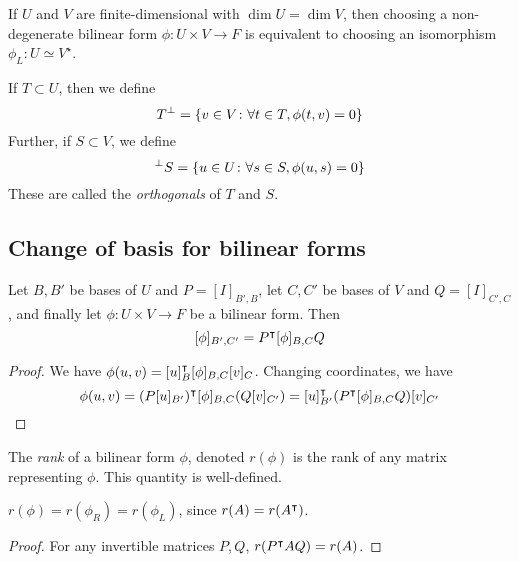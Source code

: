 \begin{corollary}
	If \( U \) and \( V \) are finite-dimensional with \( \dim U = \dim V \), then choosing a non-degenerate bilinear form \( \phi \colon U \times V \to F \) is equivalent to choosing an isomorphism \( \phi_L \colon U \simeq V^\star \).
\end{corollary}
\begin{definition}
	If \( T \subset U \), then we define
	\[
		T^\perp = \qty{ v \in V \colon \forall t \in T, \phi(t,v) = 0 }
	\]
	Further, if \( S \subset V \), we define
	\[
		^\perp S = \qty{ u \in U \colon \forall s \in S, \phi(u,s) = 0 }
	\]
	These are called the \textit{orthogonals} of \( T \) and \( S \).
\end{definition}

\subsection{Change of basis for bilinear forms}
\begin{proposition}
	Let \( B, B' \) be bases of \( U \) and \( P = [I]_{B', B} \), let \( C, C' \) be bases of \( V \) and \( Q = [I]_{C', C} \), and finally let \( \phi \colon U \times V \to F \) be a bilinear form.
	Then
	\[
		[\phi]_{B', C'} = P^\intercal [\phi]_{B,C} Q
	\]
\end{proposition}
\begin{proof}
	We have \( \phi(u,v) = [u]_B^\intercal [\phi]_{B,C} [v]_C \).
	Changing coordinates, we have
	\[
		\phi(u,v) = (P [u]_{B'})^\intercal [\phi]_{B,C} (Q [v]_{C'}) = [u]_{B'}^\intercal (P^\intercal [\phi]_{B,C} Q) [v]_{C'}
	\]
\end{proof}
\begin{lemma}
	The \textit{rank} of a bilinear form \( \phi \), denoted \( r(\phi) \) is the rank of any matrix representing \( \phi \).
	This quantity is well-defined.
\end{lemma}
\begin{remark}
	\( r(\phi) = r(\phi_R) = r(\phi_L) \), since \( r(A) = r(A^\intercal) \).
\end{remark}
\begin{proof}
	For any invertible matrices \( P, Q \), \( r(P^\intercal A Q) = r(A) \).
\end{proof}
